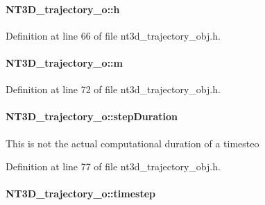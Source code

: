 \paragraph[{h}]{ {\bf NT3D\_\-trajectory\_\-o::h}}\hfill\label{class_n_t3_d__trajectory__o_a22fb9e2be33d15bc48c064bfa5fcde28}


Definition at line 66 of file nt3d\_\-trajectory\_\-obj.h.

\paragraph[{m}]{ {\bf NT3D\_\-trajectory\_\-o::m}}\hfill\label{class_n_t3_d__trajectory__o_a975416fa3b98e931dadd6cdd3344cbdc}


Definition at line 72 of file nt3d\_\-trajectory\_\-obj.h.

\paragraph[{stepDuration}]{ {\bf NT3D\_\-trajectory\_\-o::stepDuration}}\hfill\label{class_n_t3_d__trajectory__o_a5830f662fa0ace4d6d3af4479a57dd1d}
This is not the actual computational duration of a timesteo 

Definition at line 77 of file nt3d\_\-trajectory\_\-obj.h.

\paragraph[{timestep}]{ {\bf NT3D\_\-trajectory\_\-o::timestep}}\hfill\label{class_n_t3_d__trajectory__o_afddfb3d5558d8a082d32148795ddf942}


